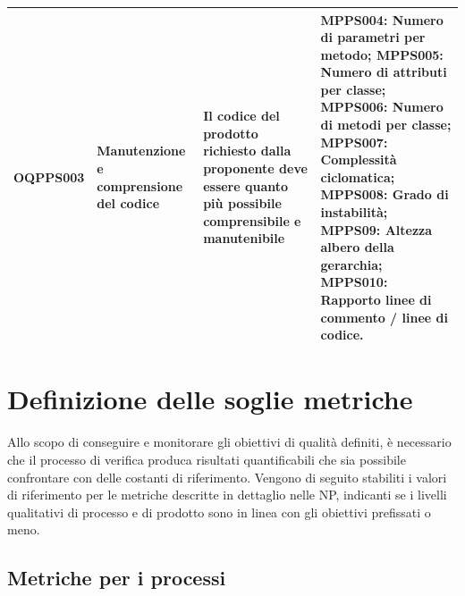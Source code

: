 \documentclass[openany,12pt,a4paper]{report}
\begin{document}
\begin{longtable}{| p{2cm} | p{3.5cm} |p{5.5cm} | p{5.5cm} |}
        	\hline
        	\newline OQPPS003 &
        	\newline Manutenzione e comprensione del codice &
        	\newline Il codice del prodotto richiesto dalla proponente deve essere quanto più possibile comprensibile e manutenibile \newline &
        	\newline MPPS004: Numero di parametri per metodo;
        	\newline MPPS005: Numero di attributi per classe;
        	\newline MPPS006: Numero di metodi per classe;
        	\newline MPPS007: Complessità ciclomatica;
        	\newline MPPS008: Grado di instabilità;
        	\newline MPPS09: Altezza albero della gerarchia;
        	\newline MPPS010: Rapporto linee di commento / linee di codice.
        	\\[1em]
        	
        	\hline
        \end{longtable}
    
	
	\section{Definizione delle soglie metriche}
	
	Allo scopo di conseguire e monitorare gli obiettivi di qualità definiti, è necessario che il processo di verifica produca risultati quantificabili che sia possibile confrontare con delle costanti di riferimento. Vengono di seguito stabiliti i valori di riferimento per le metriche descritte in dettaglio nelle NP, indicanti se i livelli qualitativi di processo e di prodotto sono in linea con gli obiettivi prefissati o meno. 	
	
	
	\subsection{Metriche per i processi}
	
\end{document}
